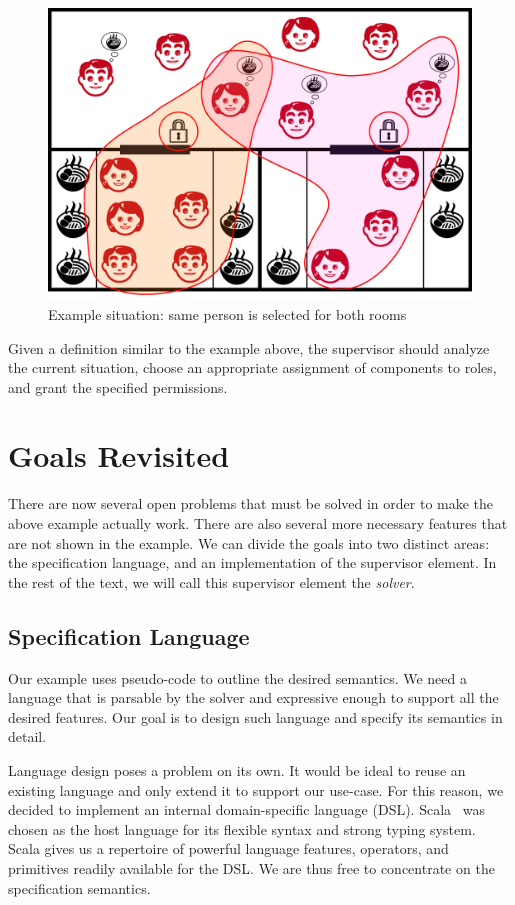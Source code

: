 \begin{figure}[h]
    \centering
    \includegraphics[width=0.68\linewidth]{img/ensemble-overlap.pdf}
    \caption{Example situation: same person is selected for both rooms}
    \label{fig:overlap}
\end{figure}

Given a definition similar to the example above, the supervisor should analyze the
current situation, choose an appropriate assignment of components to roles, and grant
the specified permissions.

\section{Goals Revisited}

There are now several open problems that must be solved in order to make the above
example actually work. There are also several more necessary features that are not shown
in the example. We can divide the goals into two distinct areas: the specification
language, and an implementation of the supervisor element. In the rest of the text, we
will call this supervisor element the \textit{solver}.

\subsection{Specification Language}

Our example uses pseudo-code to outline the desired semantics. We need a language that
is parsable by the solver and expressive enough to support all the desired features. Our
goal is to design such language and specify its semantics in detail.

Language design poses a problem on its own. It would be ideal to reuse an existing
language and only extend it to support our use-case. For this reason, we decided to
implement an internal domain-specific language (DSL). Scala~\citep{scala} was chosen as
the host language for its flexible syntax and strong typing system. Scala gives us a
repertoire of powerful language features, operators, and primitives readily available
for the DSL. We are thus free to concentrate on the specification semantics.

